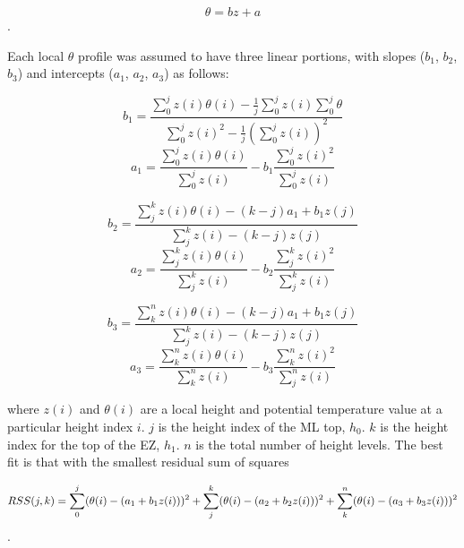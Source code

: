 \begin{equation}
\theta = bz + a 
\end{equation}.

Each local $\theta$ profile was assumed to have three linear portions, with slopes ($b_{1}$, $b_{2}$, $b_{3}$) and intercepts ($a_{1}$, $a_{2}$, $a_{3}$) as follows:

\begin{equation}
b_{1} = \frac{\sum^{j}_{0}z(i) \theta (i) - \frac{1}{j}\sum^{j}_{0}z(i)\sum^{j}_{0}\theta}{\sum^{j}_{0}z(i)^{2} - \frac{1}{j}(\sum^{j}_{0}z(i))^{2}}
\end{equation}
\begin{equation}
a_{1} = \frac{\sum^{j}_{0}z(i)\theta(i)}{\sum^{j}_{0}z(i)} - b_{1}\frac{\sum^{j}_{0}z(i)^{2}}{\sum^{j}_{0}z(i)}
\end{equation}

\begin{equation}
b_{2} = \frac{\sum^{k}_{j}z(i) \theta(i) - (k-j) a_{1}+b_{1}z(j)}{\sum^{k}_{j}z(i) - (k-j)z(j)}
\end{equation}
\begin{equation}
a_{2} = \frac{\sum^{k}_{j}z(i)\theta(i)}{\sum^{k}_{j}z(i)} - b_{2}\frac{\sum^{k}_{j}z(i)^{2}}{\sum^{k}_{j}z(i)}
\end{equation}

\begin{equation}
b_{3} = \frac{\sum^{n}_{k}z(i) \theta(i) - (k-j) a_{1}+b_{1}z(j)}{\sum^{k}_{j}z(i) - (k-j)z(j)}
\end{equation}
\begin{equation}
a_{3} = \frac{\sum^{n}_{k}z(i)\theta(i)}{\sum^{n}_{k}z(i)} - b_{3}\frac{\sum^{n}_{k}z(i)^{2}}{\sum^{n}_{j}z(i)}
\end{equation}

where $z(i)$ and $\theta(i)$ are a local height and potential temperature value at a particular height index $i$.  $j$ is the height index of the \acs{ML} top, $h_{0}$. $k$ is the height index for the top of the \acs{EZ}, $h_{1}$. $n$ is the total number of height levels.  The best fit is that with the smallest residual sum of squares   

\begin{equation}
RSS(j,k) = \sum^{j}_{0}(\theta(i) - (a_{1} + b_{1}z(i)))^{2} + \sum^{k}_{j}(\theta(i) - (a_{2} + b_{2}z(i)))^{2} + \sum^{n}_{k}(\theta(i) \\
- (a_{3} + b_{3}z(i)))^{2}
\end{equation}.



